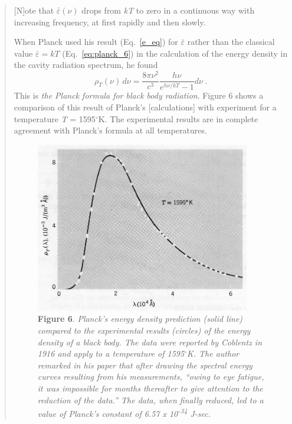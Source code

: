 \begin{quotation}
{[}N{]}ote that $\bar{\varepsilon}(\nu)$ drops from \emph{kT} to zero in a continuous
way with increasing frequency, at first rapidly and then slowly.

When Planck used his result (Eq.~\ref{e_eq}) for $\bar{\varepsilon}$ rather than the classical value
$\bar{\varepsilon} = kT$ (Eq.~\ref{eq:planck_6}) in the calculation of the energy density in the
cavity radiation spectrum, he found
\begin{equation}\label{eq:planck_12}
\rho_T(\nu)\, d\nu = \frac{8\pi\nu^2}{c^3} \frac{h\nu}{e^{h\nu/kT}-1} d\nu \; . %
\end{equation}
This is \emph{the Planck formula for black body radiation}. Figure 6
shows a comparison of this result of Planck's {[}calculations{]} with
experiment for a temperature \emph{T} = 1595$^\circ$K. The experimental results
are in complete agreement with Planck's formula at all temperatures.

%
\begin{figure}[h]
  \centering
  \captionsetup{width=4.6875in}
  \includegraphics[width=3.6875in,height=2.92708in]{images/05_planck/image037.jpg}
  \caption*{\textbf{Figure 6}. \emph{Planck's energy density prediction (solid line)
    compared to the experimental results (circles) of the energy density of
    a black body. The data were reported by Coblentz in 1916 and apply to a
    temperature of 1595$^\circ$K. The author remarked in his paper that after
    drawing the spectral energy curves resulting from his measurements,
    ``owing to eye fatigue, it was impossible for months thereafter to give
    attention to the reduction of the data.'' The data, when finally
    reduced, led to a value of Planck's constant of 6.57 x
    10\textsuperscript{-34} J-sec.}}
\end{figure}
\end{quotation}

